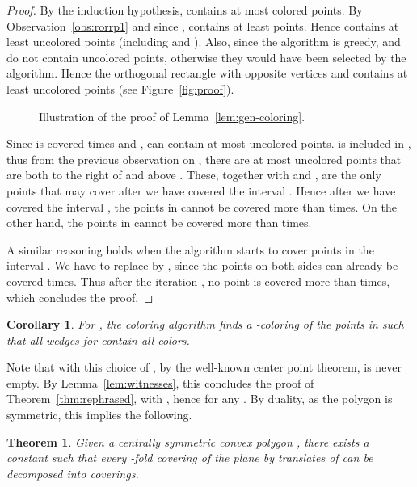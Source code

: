 \documentclass[english,11pt]{article}
\newtheorem{theorem}{Theorem}
\newtheorem{corollary}{Corollary}
\begin{document}
\begin{proof}
By the  induction hypothesis,   contains at most  colored points. By Observation~\ref{obs:rorrp1} and since ,   contains at least  points. Hence  contains at least  uncolored points (including  and ). Also, since the algorithm is greedy,  and  do not contain  uncolored points, otherwise they would have been selected by the algorithm. Hence the orthogonal rectangle  with opposite vertices  and   contains at least  uncolored points (see Figure~\ref{fig:proof}).

\begin{figure}[htb]
\begin{center}
\hspace{1.5cm}
\end{center}
\caption{Illustration of the proof of Lemma~\ref{lem:gen-coloring}.}
\end{figure}

Since  is covered  times and ,   can contain at most  uncolored points.  is included in , thus from the previous observation on , there are at most  uncolored points that are both to the right of  and above . These, together with  and , are the only points that may cover  after we have covered the interval . Hence after we have covered the interval , the points in  cannot be covered more than  times. On the other hand, the points in  cannot be covered more than  times.

A similar reasoning holds when the algorithm starts to cover points in the interval . We have to replace  by , since the points on both sides can already be covered  times. Thus after the  iteration , no point is covered more than  times, which concludes the proof.
\end{proof}



\begin{corollary}
For , the coloring algorithm finds a -coloring of the points in  such that all wedges  for  contain all  colors.
\end{corollary}

Note that with this choice of , by the well-known center point theorem,   is never empty. By Lemma~\ref{lem:witnesses}, this concludes the proof of Theorem~\ref{thm:rephrased}, with , hence for any . By duality, as the polygon  is symmetric, this implies the following.

\begin{theorem}
\label{thm:main}
Given a centrally symmetric convex polygon , there exists a constant  such that every -fold covering of the plane by translates of  can be decomposed into  coverings.
\end{theorem}



\end{document}
